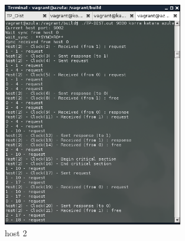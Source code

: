 \begin{figure}[h!]
    \centering
    \includegraphics[width=0.7\textwidth]{screenshots/h2_azula.png}
    \caption{host 2}
\end{figure}
